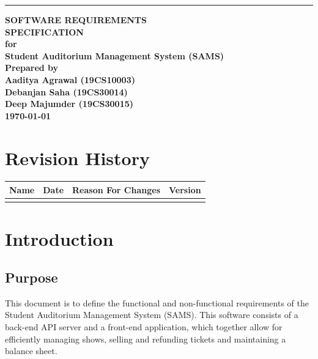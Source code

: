 \documentclass{scrreprt}
\date{}
\begin{document}
\thispagestyle{empty}
\begin{flushright}
    \rule{16cm}{5pt}\vskip1cm
    \bfseries{
        \Huge{SOFTWARE REQUIREMENTS\\ SPECIFICATION}\\
        \vspace{1.9cm}
        for\\
        \vspace{1.9cm}
        Student Auditorium Management System (SAMS)\\
        \vspace{1.9cm}
        Prepared by \\
        Aaditya Agrawal (19CS10003)\\
        Debanjan Saha (19CS30014) \\
        Deep Majumder (19CS30015) \\ 
        \vspace{1.9cm}
        \today\\
}
\end{flushright}

\tableofcontents


\chapter*{Revision History}

\begin{center}
    \begin{tabular}{|c|c|c|c|}
        \hline
	    Name & Date & Reason For Changes & Version\\
        \hline
	     &  &  & \\
        \hline
    \end{tabular}
\end{center}

\chapter{Introduction}

\section{Purpose}
This document is to define the functional and non-functional requirements of the Student Auditorium Management System (SAMS). This software consists of a back-end API server and a front-end application, which together allow for efficiently managing shows, selling and refunding tickets and maintaining a balance sheet.
\end{document}
